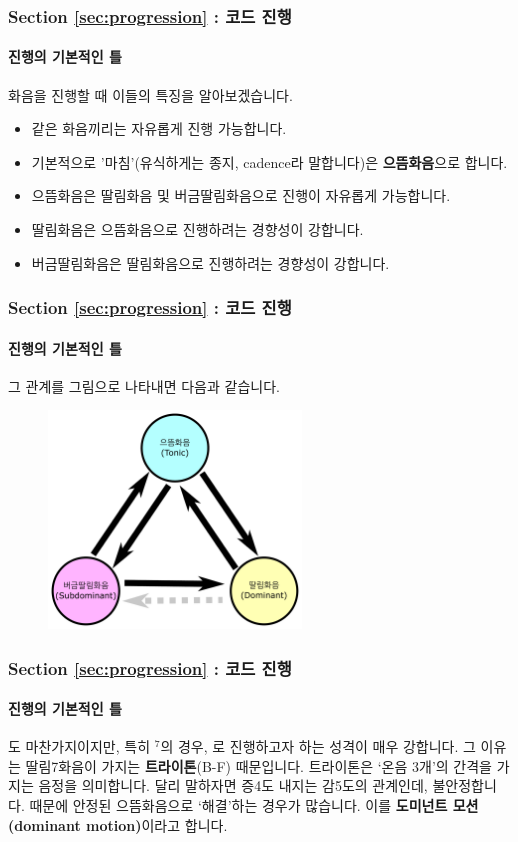 \documentclass{beamer}
\newcommand{\Rn}[1]{%
	\textup{\uppercase\expandafter{\romannumeral#1}}%
}
\begin{document}
	\begin{frame}
		\frametitle{Section \ref{sec:progression} : 코드 진행}
		\framesubtitle{진행의 기본적인 틀}
		화음을 진행할 때 이들의 특징을 알아보겠습니다.
		\begin{itemize}
			\item 같은 화음끼리는 자유롭게 진행 가능합니다.
			\item 기본적으로 '마침'(유식하게는 종지, cadence라 말합니다)은 {\bf 으뜸화음}으로 합니다.
			\item 으뜸화음은 딸림화음 및 버금딸림화음으로 진행이 자유롭게 가능합니다.
			\item 딸림화음은 으뜸화음으로 진행하려는 경향성이 강합니다.
			\item 버금딸림화음은 딸림화음으로 진행하려는 경향성이 강합니다.
		\end{itemize}
	\end{frame}
	
	\begin{frame}
		\frametitle{Section \ref{sec:progression} : 코드 진행}
		\framesubtitle{진행의 기본적인 틀}
		그 관계를 그림으로 나타내면 다음과 같습니다.
		\begin{figure}
			\centering
			\includegraphics[width=0.6\textwidth]{res/pdf/11/relationship/relationship.pdf}
		\end{figure}
	\end{frame}
	
	\begin{frame}
		\frametitle{Section \ref{sec:progression} : 코드 진행}
		\framesubtitle{진행의 기본적인 틀}
		\Rn{5}도 마찬가지이지만, 특히 \Rn{5}$^7$의 경우, \Rn{1}로 진행하고자 하는 성격이 매우 강합니다. 그 이유는 딸림7화음이 가지는 {\bf 트라이톤}(B-F) 때문입니다. 트라이톤은 `온음 3개'의 간격을 가지는 음정을 의미합니다. 달리 말하자면 증4도 내지는 감5도의 관계인데, 불안정합니다. 때문에 안정된 으뜸화음으로 `해결'하는 경우가 많습니다. 이를 {\bf 도미넌트 모션(dominant motion)}이라고 합니다.
	\end{frame}
	
\end{document}
